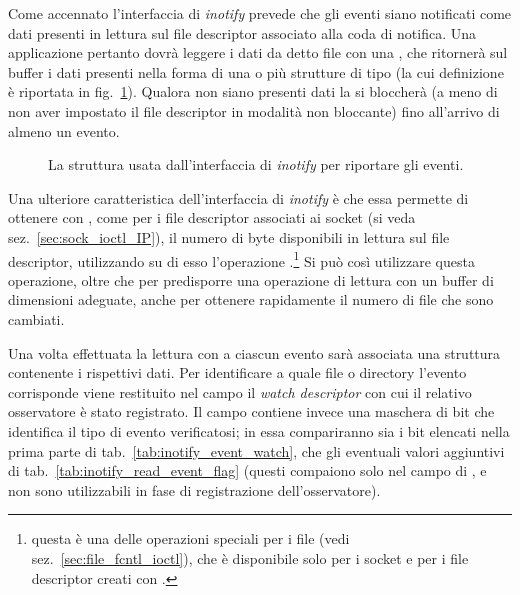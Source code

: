 Come accennato l'interfaccia di \textit{inotify} prevede che gli eventi siano
notificati come dati presenti in lettura sul file descriptor associato alla
coda di notifica. Una applicazione pertanto dovrà leggere i dati da detto file
con una , che ritornerà sul buffer i dati presenti nella forma di
una o più strutture di tipo  (la cui definizione è
riportata in fig.~\ref{fig:inotify_event}). Qualora non siano presenti dati la
 si bloccherà (a meno di non aver impostato il file descriptor in
modalità non bloccante) fino all'arrivo di almeno un evento.

\begin{figure}[!htb]
  \footnotesize \centering
  \begin{minipage}[c]{0.90\textwidth}
  \end{minipage} 
  \normalsize 
  \caption{La struttura  usata dall'interfaccia di
    \textit{inotify} per riportare gli eventi.}
  \label{fig:inotify_event}
\end{figure}

Una ulteriore caratteristica dell'interfaccia di \textit{inotify} è che essa
permette di ottenere con , come per i file descriptor associati ai
socket (si veda sez.~\ref{sec:sock_ioctl_IP}), il numero di byte disponibili
in lettura sul file descriptor, utilizzando su di esso l'operazione
.\footnote{questa è una delle operazioni speciali per i file
  (vedi sez.~\ref{sec:file_fcntl_ioctl}), che è disponibile solo per i socket
  e per i file descriptor creati con .} Si può così
utilizzare questa operazione, oltre che per predisporre una operazione di
lettura con un buffer di dimensioni adeguate, anche per ottenere rapidamente
il numero di file che sono cambiati.

Una volta effettuata la lettura con  a ciascun evento sarà
associata una struttura  contenente i rispettivi dati.
Per identificare a quale file o directory l'evento corrisponde viene
restituito nel campo  il \textit{watch descriptor} con cui il relativo
osservatore è stato registrato. Il campo  contiene invece una
maschera di bit che identifica il tipo di evento verificatosi; in essa
compariranno sia i bit elencati nella prima parte di
tab.~\ref{tab:inotify_event_watch}, che gli eventuali valori aggiuntivi di
tab.~\ref{tab:inotify_read_event_flag} (questi compaiono solo nel campo
 di , e non sono utilizzabili in fase di
registrazione dell'osservatore).

